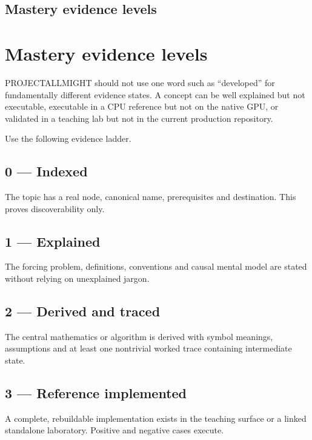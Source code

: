 \hypertarget{appendix-2a2e5bd7143a}{}
\section*{Mastery evidence levels}
\chapter{Mastery evidence levels}\label{appendix-2a2e5bd7143a-mastery-evidence-levels}

PROJECTALLMIGHT should not use one word such as ``developed'' for fundamentally different evidence states. A concept can be well explained but not executable, executable in a CPU reference but not on the native GPU, or validated in a teaching lab but not in the current production repository.

Use the following evidence ladder.

\section{0 --- Indexed}\label{appendix-2a2e5bd7143a-indexed}

The topic has a real node, canonical name, prerequisites and destination. This proves discoverability only.

\section{1 --- Explained}\label{appendix-2a2e5bd7143a-explained}

The forcing problem, definitions, conventions and causal mental model are stated without relying on unexplained jargon.

\section{2 --- Derived and traced}\label{appendix-2a2e5bd7143a-derived-and-traced}

The central mathematics or algorithm is derived with symbol meanings, assumptions and at least one nontrivial worked trace containing intermediate state.

\section{3 --- Reference implemented}\label{appendix-2a2e5bd7143a-reference-implemented}

A complete, rebuildable implementation exists in the teaching surface or a linked standalone laboratory. Positive and negative cases execute.

